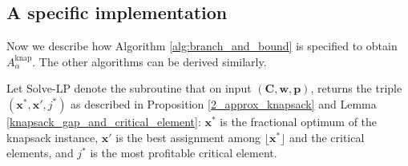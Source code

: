 \documentclass[moor,sglanonrev]{informs4}
\theoremstyle{plain}
\begin{document}
\begin{APPENDICES}

        

\subsection{A specific implementation}

Now we describe how Algorithm \ref{alg:branch_and_bound} is specified to obtain $A^{\text{knap}}_{\alpha}$. The other algorithms can be derived similarly.

Let Solve-LP denote the subroutine that on input $(\bm{C}, \bm{w}, \bm{p})$, returns the triple $(\bm{x}^*, \bm{x'}, j^*)$ as described in Proposition \ref{2_approx_knapsack} and Lemma \ref{knapsack_gap_and_critical_element}: 
$\bm{x^*}$ is the fractional optimum of the knapsack instance, $\bm{x}'$ is the best assignment among $\lfloor\bm{x}^*\rfloor$ and the critical elements, and $j^*$ is the most profitable critical element.


\end{APPENDICES}
\end{document}

